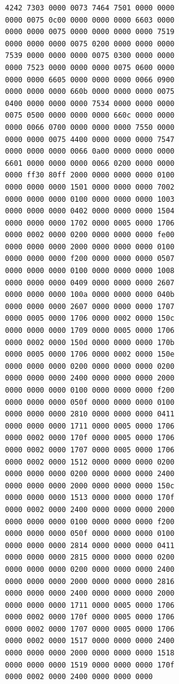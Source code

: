 \documentclass{report}
\begin{document}
\begin{mdframed}[style=example]
\begin{verbatim}
  4242 7303 0000 0073 7464 7501 0000 0000
  0000 0075 0c00 0000 0000 0000 6603 0000
  0000 0000 0075 0000 0000 0000 0000 7519
  0000 0000 0000 0075 0200 0000 0000 0000
  7539 0000 0000 0000 0075 0300 0000 0000
  0000 7523 0000 0000 0000 0075 0600 0000
  0000 0000 6605 0000 0000 0000 0066 0900
  0000 0000 0000 660b 0000 0000 0000 0075
  0400 0000 0000 0000 7534 0000 0000 0000
  0075 0500 0000 0000 0000 660c 0000 0000
  0000 0066 0700 0000 0000 0000 7550 0000
  0000 0000 0075 4400 0000 0000 0000 7547
  0000 0000 0000 0066 0a00 0000 0000 0000
  6601 0000 0000 0000 0066 0200 0000 0000
  0000 ff30 80ff 2000 0000 0000 0000 0100
  0000 0000 0000 1501 0000 0000 0000 7002
  0000 0000 0000 0100 0000 0000 0000 1003
  0000 0000 0000 0402 0000 0000 0000 1504
  0000 0000 0000 1702 0000 0005 0000 1706
  0000 0002 0000 0200 0000 0000 0000 fe00
  0000 0000 0000 2000 0000 0000 0000 0100
  0000 0000 0000 f200 0000 0000 0000 0507
  0000 0000 0000 0100 0000 0000 0000 1008
  0000 0000 0000 0409 0000 0000 0000 2607
  0000 0000 0000 100a 0000 0000 0000 040b
  0000 0000 0000 2607 0000 0000 0000 1707
  0000 0005 0000 1706 0000 0002 0000 150c
  0000 0000 0000 1709 0000 0005 0000 1706
  0000 0002 0000 150d 0000 0000 0000 170b
  0000 0005 0000 1706 0000 0002 0000 150e
  0000 0000 0000 0200 0000 0000 0000 0200
  0000 0000 0000 2400 0000 0000 0000 2000
  0000 0000 0000 0100 0000 0000 0000 f200
  0000 0000 0000 050f 0000 0000 0000 0100
  0000 0000 0000 2810 0000 0000 0000 0411
  0000 0000 0000 1711 0000 0005 0000 1706
  0000 0002 0000 170f 0000 0005 0000 1706
  0000 0002 0000 1707 0000 0005 0000 1706
  0000 0002 0000 1512 0000 0000 0000 0200
  0000 0000 0000 0200 0000 0000 0000 2400
  0000 0000 0000 2000 0000 0000 0000 150c
  0000 0000 0000 1513 0000 0000 0000 170f
  0000 0002 0000 2400 0000 0000 0000 2000
  0000 0000 0000 0100 0000 0000 0000 f200
  0000 0000 0000 050f 0000 0000 0000 0100
  0000 0000 0000 2814 0000 0000 0000 0411
  0000 0000 0000 2815 0000 0000 0000 0200
  0000 0000 0000 0200 0000 0000 0000 2400
  0000 0000 0000 2000 0000 0000 0000 2816
  0000 0000 0000 2400 0000 0000 0000 2000
  0000 0000 0000 1711 0000 0005 0000 1706
  0000 0002 0000 170f 0000 0005 0000 1706
  0000 0002 0000 1707 0000 0005 0000 1706
  0000 0002 0000 1517 0000 0000 0000 2400
  0000 0000 0000 2000 0000 0000 0000 1518
  0000 0000 0000 1519 0000 0000 0000 170f
  0000 0002 0000 2400 0000 0000 0000
\end{verbatim}
\end{mdframed}
\end{document}
